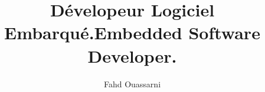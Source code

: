 
\author{Fahd Ouassarni}

\ifdefined\islangfr
\title{Dévelopeur Logiciel Embarqué.}
\else\fi

\ifdefined\islangen
\title{Embedded Software Developer.}
\else\fi

\address{6 Boulevard Mar\'echal Juin\\
         14000 CAEN}

\maketitle
